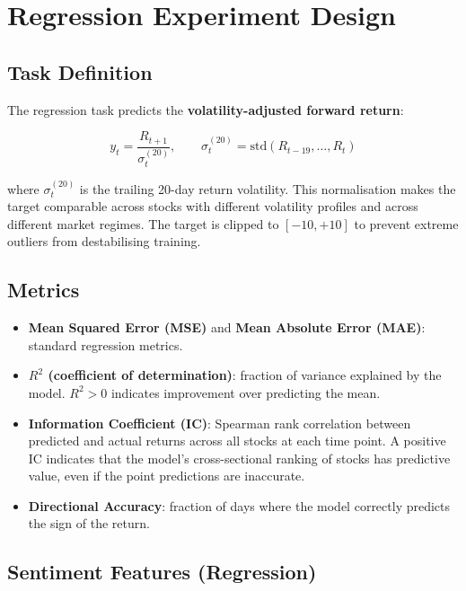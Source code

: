 \section{Regression Experiment Design}
\label{sec:reg-experiment}

\subsection{Task Definition}

The regression task predicts the \textbf{volatility-adjusted forward return}:

\begin{equation}
  y_t = \frac{R_{t+1}}{\sigma_{t}^{(20)}}, \qquad
  \sigma_{t}^{(20)} = \text{std}(R_{t-19}, \ldots, R_t)
  \label{eq:vol-adj-return}
\end{equation}

where $\sigma_{t}^{(20)}$ is the trailing 20-day return volatility.  This
normalisation makes the target comparable across stocks with different
volatility profiles and across different market regimes.  The target is clipped
to $[-10, +10]$ to prevent extreme outliers from destabilising training.

\subsection{Metrics}

\begin{itemize}
  \item \textbf{Mean Squared Error (MSE)} and \textbf{Mean Absolute Error (MAE)}:
        standard regression metrics.
  \item \textbf{$R^2$ (coefficient of determination)}: fraction of variance
        explained by the model.  $R^2 > 0$ indicates improvement over predicting
        the mean.
  \item \textbf{Information Coefficient (IC)}: Spearman rank correlation between
        predicted and actual returns across all stocks at each time point.  A
        positive IC indicates that the model's cross-sectional ranking of stocks
        has predictive value, even if the point predictions are inaccurate.
  \item \textbf{Directional Accuracy}: fraction of days where the model correctly
        predicts the sign of the return.
\end{itemize}

\subsection{Sentiment Features (Regression)}

